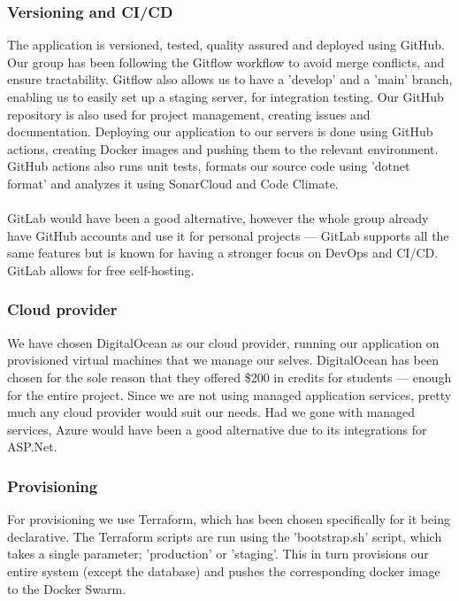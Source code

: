 \subsubsection{Versioning and CI/CD}
The application is versioned, tested, quality assured and deployed using
GitHub. Our group has been following the Gitflow workflow to avoid merge conflicts, and ensure tractability. Gitflow also allows us to have a 'develop' and a 'main' branch, enabling us to easily set up a staging server, for integration testing.\newline 
Our GitHub repository is also used for project management, creating issues and documentation. Deploying our application to our servers is done using GitHub actions, creating Docker images and pushing them to the relevant environment. GitHub actions also runs unit tests, formats our source code using 'dotnet format' and analyzes it using SonarCloud and Code Climate.\\\\
GitLab would have been a good alternative, however the whole group already have GitHub accounts and use it for personal projects — GitLab supports all the same features but is known for having a stronger focus on DevOps and CI/CD\cite{gitlabvsgithub}. GitLab allows for free self-hosting. 

\subsubsection{Cloud provider}
We have chosen DigitalOcean as our cloud provider, running our application on provisioned virtual machines that we manage our selves. DigitalOcean has been chosen for the sole reason that they offered \$200 in credits for students — enough for the entire project.\newline 
Since we are not using managed application services, pretty much any cloud provider would suit our needs. Had we gone with managed services, Azure would have been a good alternative due to its integrations for ASP.Net.

\subsubsection{Provisioning}
For provisioning we use Terraform, which has been chosen specifically for it being declarative. The Terraform scripts are run using the 'bootstrap.sh' script, which takes a single parameter; 'production' or 'staging'. This in turn provisions our entire system (except the database) and pushes the corresponding docker image to the Docker Swarm.

